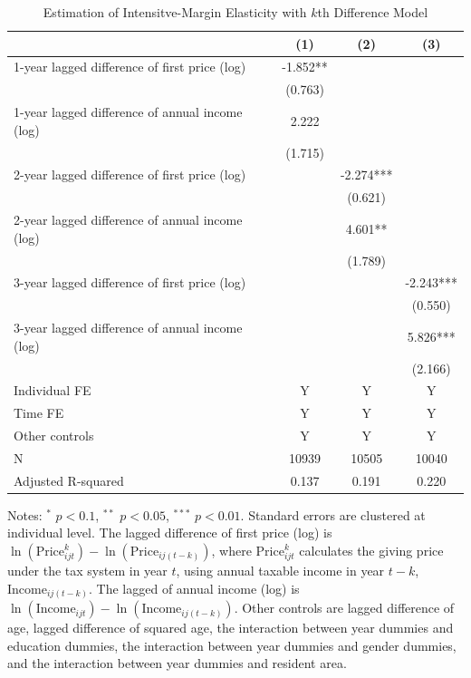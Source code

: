 \documentclass[
  11pt,
  a4paper,
]{article}
\begin{document}
\begin{table}

\caption{\label{tab:kdiffIntensive}Estimation of Intensitve-Margin Elasticity with $k$th Difference Model}
\centering
\fontsize{9}{11}\selectfont
\begin{threeparttable}
\begin{tabular}[t]{lccc}
\toprule
 & (1) & (2) & (3)\\
\midrule
1-year lagged difference of first price (log) & -1.852** &  & \\
 & (0.763) &  & \\
1-year lagged difference of annual income (log) & 2.222 &  & \\
 & (1.715) &  & \\
2-year lagged difference of first price (log) &  & -2.274*** & \\
 &  & (0.621) & \\
2-year lagged difference of annual income (log) &  & 4.601** & \\
 &  & (1.789) & \\
3-year lagged difference of first price (log) &  &  & -2.243***\\
 &  &  & (0.550)\\
3-year lagged difference of annual income (log) &  &  & 5.826***\\
 &  &  & (2.166)\\
Individual FE & Y & Y & Y\\
Time FE & Y & Y & Y\\
Other controls & Y & Y & Y\\
N & 10939 & 10505 & 10040\\
Adjusted R-squared & 0.137 & 0.191 & 0.220\\
\bottomrule
\end{tabular}
\begin{tablenotes}
\item Notes: $^{*}$ $p < 0.1$, $^{**}$ $p < 0.05$, $^{***}$ $p < 0.01$. Standard errors are clustered at individual level. The lagged difference of first price (log) is $\ln(\text{Price}^k_{ijt}) - \ln(\text{Price}_{ij(t-k)})$, where $\text{Price}^k_{ijt}$ calculates the giving price under the tax system in year $t$, using annual taxable income in year $t-k$, $\text{Income}_{ij(t-k)}$. The lagged of annual income (log) is $\ln(\text{Income}_{ijt}) - \ln(\text{Income}_{ij(t-k)})$. Other controls are lagged difference of age, lagged difference of squared age, the interaction between year dummies and education dummies, the interaction between year dummies and gender dummies, and the interaction between year dummies and resident area.
\end{tablenotes}
\end{threeparttable}
\end{table}
\end{document}
